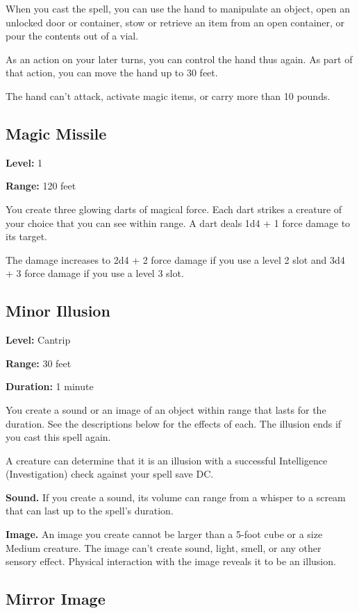 \documentclass[12pt,letterpaper,twocolumn,openany,nodeprecatedcode,bg=none]{dndbook}
\let\oldsubsection\subsection
\renewcommand{\subsection}[1]{%
  \needspace{5\baselineskip}%
  \oldsubsection{#1}%
}
\begin{document}
When you cast the spell, you can use the hand to manipulate an object,
open an unlocked door or container, stow or retrieve an item from an
open container, or pour the contents out of a vial.

As an action on your later turns, you can control the hand thus again.
As part of that action, you can move the hand up to 30 feet.

The hand can't attack, activate magic items, or carry more than 10
pounds.

\subsection{Magic Missile}\label{magic-missile}

\textbf{Level:} 1

\textbf{Range:} 120 feet

You create three glowing darts of magical force. Each dart strikes a
creature of your choice that you can see within range. A dart deals 1d4
+ 1 force damage to its target.

The damage increases to 2d4 + 2 force damage if you use a level 2 slot
and 3d4 + 3 force damage if you use a level 3 slot.

\subsection{Minor Illusion}\label{minor-illusion}

\textbf{Level:} Cantrip

\textbf{Range:} 30 feet

\textbf{Duration:} 1 minute

You create a sound or an image of an object within range that lasts for
the duration. See the descriptions below for the effects of each. The
illusion ends if you cast this spell again.

A creature can determine that it is an illusion with a successful
Intelligence (Investigation) check against your spell save DC.

\textbf{Sound.} If you create a sound, its volume can range from a
whisper to a scream that can last up to the spell's duration.

\textbf{Image.} An image you create cannot be larger than a 5-foot cube
or a size Medium creature. The image can't create sound, light, smell,
or any other sensory effect. Physical interaction with the image reveals
it to be an illusion.

\subsection{Mirror Image}\label{mirror-image}
\end{document}
